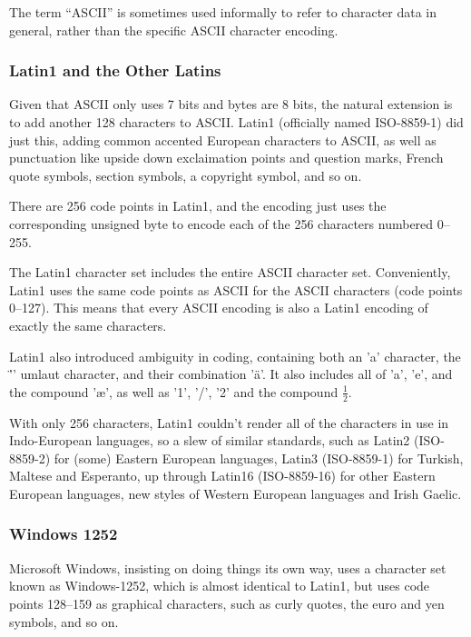 The term ``ASCII'' is sometimes used informally to refer to character
data in general, rather than the specific ASCII character encoding.

\subsubsection{Latin1 and the Other Latins}\label{section:latin1}

Given that ASCII only uses 7 bits and bytes are 8 bits, the natural
extension is to add another 128 characters to ASCII.  Latin1
(officially named ISO-8859-1) did just this, adding common accented
European characters to ASCII, as well as punctuation like upside down
exclaimation points and question marks, French quote symbols, section
symbols, a copyright symbol, and so on.  

There are 256 code points in Latin1, and the encoding just uses the
corresponding unsigned byte to encode each of the 256 characters
numbered 0--255.

The Latin1 character set includes the entire ASCII character set.
Conveniently, Latin1 uses the same code points as ASCII for the ASCII
characters (code points 0--127).  This means that every ASCII encoding
is also a Latin1 encoding of exactly the same characters.

Latin1 also introduced ambiguity in coding, containing both an 'a'
character, the '\"{}' umlaut character, and their combination '\"{a}'.
It also includes all of 'a', 'e', and the compound '\ae', as well as
'1', '/', '2' and the compound $\frac{1}{2}$.

With only 256 characters, Latin1 couldn't render all of the characters
in use in Indo-European languages, so a slew of similar standards,
such as Latin2 (ISO-8859-2) for (some) Eastern European languages,
Latin3 (ISO-8859-1) for Turkish, Maltese and Esperanto, up through
Latin16 (ISO-8859-16) for other Eastern European languages, new styles
of Western European languages and Irish Gaelic.  

\subsubsection{Windows 1252}

Microsoft Windows, insisting on doing things its own way, uses a
character set known as Windows-1252, which is almost identical to Latin1,
but uses code points 128--159 as graphical characters, such as curly
quotes, the euro and yen symbols, and so on.


